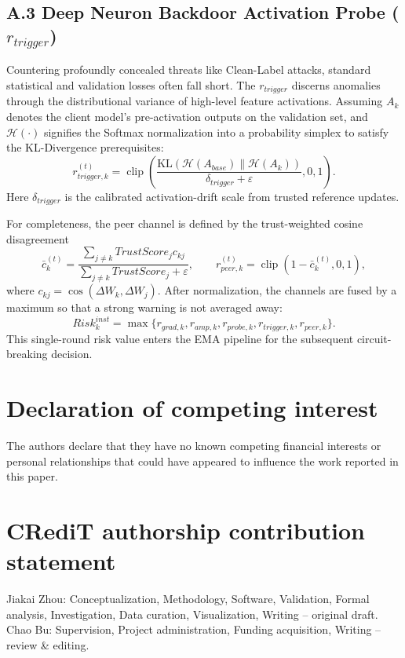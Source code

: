 \documentclass[final,5p,times,twocolumn]{elsarticle/elsarticle}
\begin{document}
\subsection{A.3 Deep Neuron Backdoor Activation Probe \texorpdfstring{($r_{trigger}$)}{(r-trigger)}}
Countering profoundly concealed threats like Clean-Label attacks, standard statistical and validation losses often fall short. The $r_{trigger}$ discerns anomalies through the distributional variance of high-level feature activations. Assuming $A_k$ denotes the client model's pre-activation outputs on the validation set, and $\mathcal{H}(\cdot)$ signifies the Softmax normalization into a probability simplex to satisfy the KL-Divergence prerequisites:
\begin{equation}
    r_{trigger,k}^{(t)}=\operatorname{clip}\!\left(
    \frac{\mathrm{KL}(\mathcal{H}(A_{base})\|\mathcal{H}(A_k))}
    {\delta_{trigger}+\varepsilon},0,1\right).
\end{equation}
Here $\delta_{trigger}$ is the calibrated activation-drift scale from trusted reference updates.

For completeness, the peer channel is defined by the trust-weighted cosine disagreement
\begin{equation}
 \bar c_k^{(t)}=\frac{\sum_{j\ne k}TrustScore_j c_{kj}}
 {\sum_{j\ne k}TrustScore_j+\varepsilon},\qquad
 r_{peer,k}^{(t)}=\operatorname{clip}(1-\bar c_k^{(t)},0,1),
\end{equation}
where $c_{kj}=\cos(\Delta W_k,\Delta W_j)$. After normalization, the channels are fused by a maximum so that a strong warning is not averaged away:
\begin{equation}
 Risk_k^{inst}=\max\{r_{grad,k},r_{amp,k},r_{probe,k},r_{trigger,k},r_{peer,k}\}.
\end{equation}
This single-round risk value enters the EMA pipeline for the subsequent circuit-breaking decision.

\section*{Declaration of competing interest}
The authors declare that they have no known competing financial interests or personal relationships that could have appeared to influence the work reported in this paper.

\section*{CRediT authorship contribution statement}
Jiakai Zhou: Conceptualization, Methodology, Software, Validation, Formal analysis, Investigation, Data curation, Visualization, Writing -- original draft. Chao Bu: Supervision, Project administration, Funding acquisition, Writing -- review \& editing.
\end{document}
